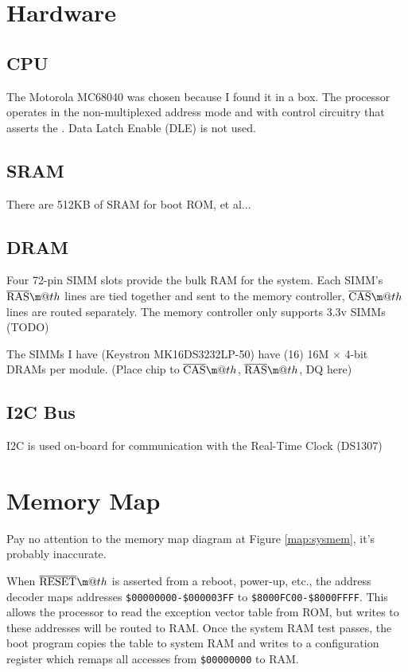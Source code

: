 \documentclass{article}
\makeatletter
\newcommand*{\textoverline}[1]{$\overline{\hbox{#1}}\m@th$}
\makeatother
\begin{document}
\section{Hardware}

\subsection{CPU}

The Motorola MC68040 was chosen because I found it in a box. The processor
operates in the non-multiplexed address mode and with control circuitry that
asserts the . Data Latch Enable (DLE) is not used.

\subsection{SRAM}

There are 512KB of SRAM for boot ROM, et al...

\subsection{DRAM}

Four 72-pin SIMM slots provide the bulk RAM for the system. Each SIMM's
\textoverline{RAS} lines are tied together and sent to the memory controller,
\textoverline{CAS} lines are routed separately. The memory controller only
supports 3.3v SIMMs (TODO)

The SIMMs I have (Keystron MK16DS3232LP-50) have (16) 16M $\times$ 4-bit DRAMs
per module. (Place chip to \textoverline{CAS}, \textoverline{RAS}, DQ here)

\subsection{I2C Bus}

I2C is used on-board for communication with the Real-Time Clock (DS1307)

\section{Memory Map}

Pay no attention to the memory map diagram at Figure \ref{map:sysmem}, it's
probably inaccurate.

\vspace{12pt}

When \textoverline{RESET} is asserted from a reboot, power-up, etc., the address
decoder maps addresses \mbox{\texttt{\$00000000-\$000003FF}} to
\mbox{\texttt{\$8000FC00-\$8000FFFF}}. This allows the processor to read the
exception vector table from ROM, but writes to these addresses will be routed to
RAM. Once the system RAM test passes, the boot program copies the table to
system RAM and writes to a configuration register which remaps all accesses from
\texttt{\$00000000} to RAM.
\end{document}

